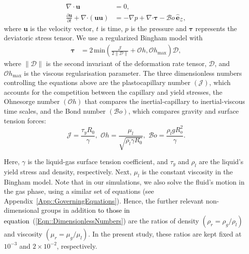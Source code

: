 \documentclass[final]{jfm}
\newcommand*\red{\textcolor{black}}
\begin{document}
\begin{align}
\nabla \cdot \boldsymbol{u}&=0,\label{Eqn::FinalFormLiqContinuity}\\
	\frac{\partial\boldsymbol{u}}{\partial t} + \nabla\boldsymbol{\cdot}\left(\boldsymbol{uu}\right) &= -\nabla p + \nabla\boldsymbol{\cdot}\boldsymbol{\tau} - \mathcal{B}o\,\hat{\boldsymbol{e}}_{\boldsymbol{\mathcal{Z}}}\label{Eqn::FinalFormLiqNS},
\end{align}
%
where $\boldsymbol{u}$ is the velocity vector, $t$ is time, $p$ is the pressure and $\boldsymbol{\tau}$ represents the deviatoric stress tensor. We use a regularized Bingham model with
\begin{align}
    \boldsymbol{\tau} &= 2\,\text{min}\left(\frac{\mathcal{J}}{2\|\boldsymbol{\mathcal{D}}\|} + \mathcal{O}h, \mathcal{O}h_\text{max}\right)\boldsymbol{\mathcal{D}},\label{Eqn::RegularizedForm}
\end{align}
%
where $\|\boldsymbol{\mathcal{D}}\|$ is the second invariant of the deformation rate tensor, $\boldsymbol{\mathcal{D}}$, and $\mathcal{O}h_{\text{max}}$ is the viscous regularisation parameter. The three dimensionless numbers controlling the equations above are the plastocapillary number $\left(\mathcal{J}\right)$, which accounts for the competition between the capillary and yield stresses, the Ohnesorge number $\left(\mathcal{O}h\right)$ that compares the inertial-capillary to inertial-viscous time scales, and the Bond number $\left(\mathcal{B}o\right)$, which compares gravity and surface tension forces:
\begin{equation}\label{Eqn::DimensionlessNumbers}
	\mathcal{J} = \frac{\tau_yR_0}{\gamma},\,\,\mathcal{O}h = \frac{\mu_l}{\sqrt{\rho_l\gamma R_0}},\,\,\mathcal{B}o = \frac{\rho_l gR_o^2}{\gamma}.
\end{equation}

\noindent Here, $\gamma$ is the liquid-gas surface tension coefficient, and $\tau_y$ and $\rho_l$ are the liquid's yield stress and density, respectively. Next, $\mu_l$ is the constant viscosity in the Bingham model. Note that in our simulations, we also solve the fluid's motion in the gas phase, using a similar set of equations (see Appendix~\ref{App::GoverningEquations}). Hence, the further relevant non-dimensional groups in addition \red{to those in equation}~(\ref{Eqn::DimensionlessNumbers}) are the ratios of density $\left(\rho_r = \rho_g/\rho_l\right)$ and viscosity $\left(\mu_r = \mu_g/\mu_l\right)$. In the present study, these ratios are kept fixed at $10^{-3}$ and $2 \times 10^{-2}$, respectively. 
\end{document}
